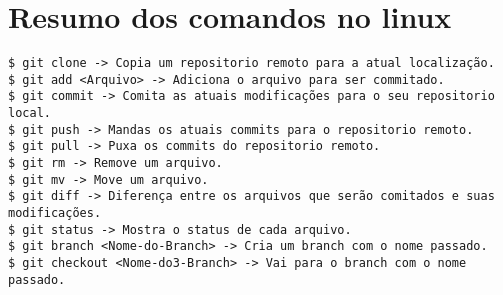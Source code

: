 \documentclass{article}
\begin{document}
\section{Resumo dos comandos no linux}
\begin{tabbing}
\hspace{0.5cm}  \=  \verb#$ git clone -> Copia um repositorio remoto para a atual localização.#\\
                \>  \verb#$ git add <Arquivo> -> Adiciona o arquivo para ser commitado.#\\
                \>  \verb#$ git commit -> Comita as atuais modificações para o seu repositorio local.#\\
                \>  \verb#$ git push -> Mandas os atuais commits para o repositorio remoto.#\\
                \>  \verb#$ git pull -> Puxa os commits do repositorio remoto.#\\
                \>  \verb#$ git rm -> Remove um arquivo.#\\
                \>  \verb#$ git mv -> Move um arquivo.#\\
                \>  \verb#$ git diff -> Diferença entre os arquivos que serão comitados e suas modificações.#\\
                \>  \verb#$ git status -> Mostra o status de cada arquivo.#\\
                \>  \verb#$ git branch <Nome-do-Branch> -> Cria um branch com o nome passado.#\\
                \>  \verb#$ git checkout <Nome-do3-Branch> -> Vai para o branch com o nome passado.#\\
\end{tabbing}
\end{document}
